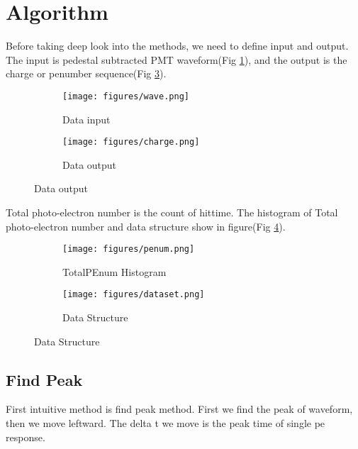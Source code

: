\section{Algorithm} %

Before taking deep look into the methods, we need to define input and output. The input is pedestal subtracted PMT waveform(Fig \ref{fig:input}), and the output is the charge or penumber sequence(Fig \ref{fig:output}). 

\begin{figure}[H]
\begin{minipage}{.5\textwidth}
\begin{figure}[H]
    \centering
        \texttt{[image: figures/wave.png]}
    \caption{Data input}
    \label{fig:input}
\end{figure}
\end{minipage}
\begin{minipage}{.5\textwidth}
\begin{figure}[H]
    \centering
        \texttt{[image: figures/charge.png]}
    \caption{Data output}
    \label{fig:output}
\end{figure}
\end{minipage}
\end{figure}

Total photo-electron number is the count of hittime. The histogram of Total photo-electron number and data structure show in figure(Fig \ref{fig:penum}). 

\begin{figure}[H]
\begin{minipage}{.5\textwidth}
\begin{figure}[H]
    \centering
        \texttt{[image: figures/penum.png]}
    \caption{TotalPEnum Histogram}
    \label{fig:penum}
\end{figure}
\end{minipage}
\begin{minipage}{.5\textwidth}
\begin{figure}[H]
    \centering
        \texttt{[image: figures/dataset.png]}
    \caption{Data Structure}
    \label{fig:set}
\end{figure}
\end{minipage}
\end{figure}

\subsection{Find Peak}
First intuitive method is find peak method. First we find the peak of waveform, then we move leftward. The delta t we move is the peak time of single pe response. 

